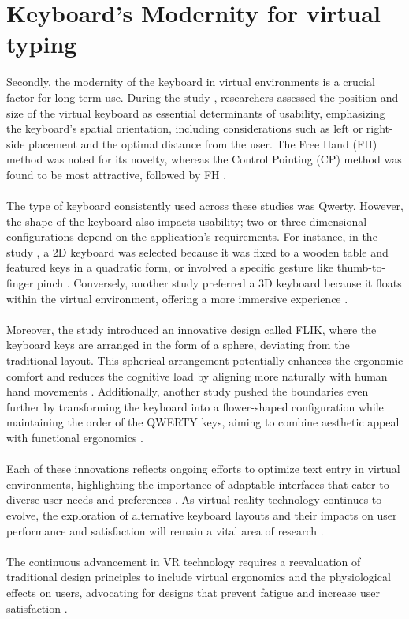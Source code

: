 \section{Keyboard’s Modernity for virtual typing}
\label{sec: Keyboard’s Modernity for virtual typing} 
Secondly, the modernity of the keyboard in virtual environments is a crucial factor for long-term use. During the study \cite{kruger2018text}, researchers assessed the position and size of the virtual keyboard as essential determinants of usability, emphasizing the keyboard's spatial orientation, including considerations such as left or right-side placement and the optimal distance from the user. The Free Hand (FH) method was noted for its novelty, whereas the Control Pointing (CP) method was found to be most attractive, followed by FH \cite{mcgill2015dovetail}. \\ \\
The type of keyboard consistently used across these studies was Qwerty. However, the shape of the keyboard also impacts usability; two or three-dimensional configurations depend on the application's requirements. For instance, in the study \cite{dudley2019keyboard}, a 2D keyboard was selected because it was fixed to a wooden table and featured keys in a quadratic form, or involved a specific gesture like thumb-to-finger pinch \cite{kruger2018text}. Conversely, another study \cite{pseudoHaptics2022} preferred a 3D keyboard because it floats within the virtual environment, offering a more immersive experience \cite{zhang2017deep}.\\\\
Moreover, the study \cite{teather2020flik} introduced an innovative design called FLIK, where the keyboard keys are arranged in the form of a sphere, deviating from the traditional layout. This spherical arrangement potentially enhances the ergonomic comfort and reduces the cognitive load by aligning more naturally with human hand movements \cite{stanney2019handbook}. Additionally, another study \cite{leng2022flower} pushed the boundaries even further by transforming the keyboard into a flower-shaped configuration while maintaining the order of the QWERTY keys, aiming to combine aesthetic appeal with functional ergonomics \cite{wickens2015engineering}. \\ \\
Each of these innovations reflects ongoing efforts to optimize text entry in virtual environments, highlighting the importance of adaptable interfaces that cater to diverse user needs and preferences \cite{baljko2006automatic, hincapie2014metaanalysis}. As virtual reality technology continues to evolve, the exploration of alternative keyboard layouts and their impacts on user performance and satisfaction will remain a vital area of research \cite{shneiderman2010designing, norman2013design}. \\ \\
The continuous advancement in \ac{VR} technology requires a reevaluation of traditional design principles to include virtual ergonomics and the physiological effects on users, advocating for designs that prevent fatigue and increase user satisfaction \cite{charness2005aging, jacko2009human}.


